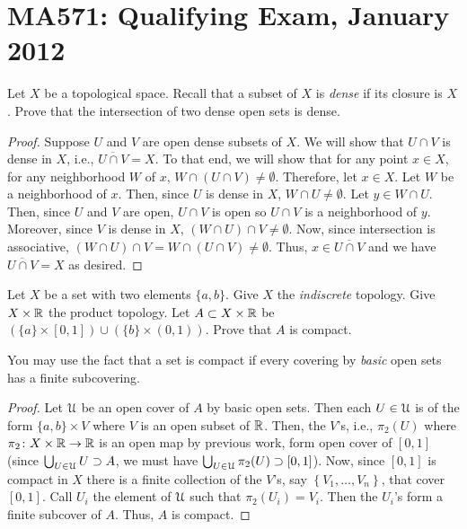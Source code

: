 \section{MA571: Qualifying Exam, January 2012}
\begin{problem}
Let $X$ be a topological space. Recall that a subset of $X$ is \emph{dense}
if its closure is $X$. Prove that the intersection of two dense open sets is
dense.
\end{problem}
\begin{proof}
Suppose $U$ and $V$ are open dense subsets of $X$. We will show that $U\cap
V$ is dense in $X$, i.e., $\overline{U\cap V}=X$. To that end, we will show
that for any point $x\in X$, for any neighborhood $W$ of $x$, $W\cap(U\cap
V)\neq\emptyset$. Therefore, let $x\in X$. Let $W$ be a neighborhood of
$x$. Then, since $U$ is dense in $X$, $W\cap U\neq\emptyset$. Let $y\in
W\cap U$. Then, since $U$ and $V$ are open, $U\cap V$ is open so $U\cap V$
is a neighborhood of $y$. Moreover, since $V$ is dense in $X$, $(W\cap
U)\cap V\neq\emptyset$. Now, since intersection is associative, $(W\cap
U)\cap V=W\cap(U\cap V)\neq\emptyset$. Thus, $x\in\overline{U\cap V}$ and
we have $\overline{U\cap V}=X$ as desired.
\end{proof}

\begin{problem}
Let $X$ be a set with two elements $\{a,b\}$. Give $X$ the
\emph{indiscrete} topology. Give $X\times\mathbb{R}$ the product topology. Let
$A\subset X\times\mathbb{R}$ be $(\{a\}\times[0,1])\cup(\{b\}\times(0,1))$. Prove
that $A$ is compact.

You may use the fact that a set is compact if every covering by
\emph{basic} open sets has a finite subcovering.
\end{problem}
\begin{proof}
Let $\mathcal{U}$ be an open cover of $A$ by basic open sets. Then each
$U\in\mathcal{U}$ is of the form $\{a,b\}\times V$ where $V$ is an open subset of
$\mathbb{R}$. Then, the $V$'s, i.e., $\pi_2(U)$ where $\pi_2\colon
X\times\mathbb{R}\to\mathbb{R}$ is an open map by previous work, form open cover of
$[0,1]$ (since $\bigcup_{U\in\mathcal{U}} U\supset A$, we must have
$\bigcup_{U\in\mathcal{U}}\pi_2(U)\supset[0,1]$). Now, since $[0,1]$ is compact
in $X$ there is a finite collection of the $V$'s, say
$\left\{V_1,\dotsc,V_n\right\}$, that cover $[0,1]$. Call $U_i$ the element of
$\mathcal{U}$ such that $\pi_2(U_i)=V_i$. Then the $U_i$'s form a finite subcover
of $A$. Thus, $A$ is compact.
\end{proof}

